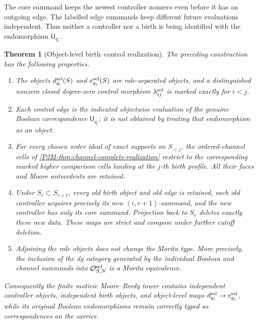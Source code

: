 \documentclass[11pt]{article}
\newtheorem{theorem}{Theorem}[section]
\theoremstyle{remark}
\begin{document}
The core summand keeps the newest controller nonzero even before it has an
outgoing edge.  The labelled edge summands keep different future evaluations
independent.  Thus neither a controller nor a birth is being identified with
the endomorphism \(\mathsf U_{q_i}\).

\begin{theorem}[Object-level birth--control realization]
\label{P2M-thm:role-separated-objectification}
The preceding construction has the following properties.
\begin{enumerate}[label=\textup{(\roman*)}]
\item The objects \(d_{q_i}^{\rm sel}(S)\) and
      \(e_{q_j}^{\rm sel}(S)\) are role-separated objects, and
      a distinguished nonzero closed degree-zero control morphism
      \(\lambda_{ij}^{\rm sel}\) is marked exactly for \(i<j\).
\item Each control edge is the indicated objectwise evaluation of the genuine
      Boolean correspondence \(\mathsf U_{q_i}\); it is not obtained by treating
      that endomorphism as an object.
\item For every chosen order ideal of exact supports on \(S_{<j}\), the
      ordered-channel cells of
      \cref{P2M-thm:channel-complete-realization} restrict to the corresponding
      marked higher comparison cells landing at the \(j\)-th birth profile.
      All their faces and Moore antecedents are retained.
\item Under \(S_r\subset S_{r+1}\), every old birth object and old edge is
      retained, each old controller acquires precisely its new
      \((i,r+1)\)-summand, and the new controller has only its core summand.
      Projection back to \(S_r\) deletes exactly these new data.  These maps
      are strict and compose under further cutoff deletion.
\item Adjoining the role objects does not change the Morita type.  More
      precisely, the inclusion of the dg category generated by the individual
      Boolean and channel summands into \(\mathcal O_{S,N}^{\rm sel}\) is a
      Morita equivalence.
\end{enumerate}
Consequently the finite motivic Moore--Reedy tower contains independent
controller objects, independent birth objects, and object-level maps
\(d_{q_i}^{\rm sel}\to e_{q_j}^{\rm sel}\), while its original Boolean
endomorphisms remain correctly typed as correspondences on the carrier.
\end{theorem}
\end{document}
